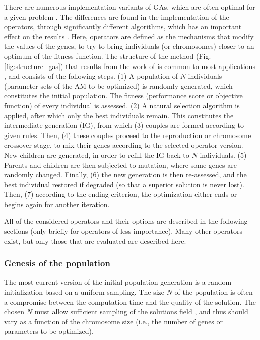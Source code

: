 \documentclass{ametsoc}
\begin{document}
There are numerous implementation variants of GAs, which are often optimal for a given problem \citep{Hart1991a, Schraudolph1992a}. The differences are found in the implementation of the operators, through significantly different algorithms, which has an important effect on the results \citep{Gaffney2010a}. Here, operators are defined as the mechanisms that modify the values of the genes, to try to bring individuals (or chromosomes) closer to an optimum of the fitness function. The structure of the method (Fig. \ref{fig:structure_gas}) that results from the work of \citet{Holland1992b} is common to most applications \citep{Back1993b}, and consists of the following steps. (1) A population of $N$ individuals (parameter sets of the AM to be optimized) is randomly generated, which constitutes the initial population. The fitness (performance score or objective function) of every individual is assessed. (2) A natural selection algorithm is applied, after which only the best individuals remain. This constitutes the intermediate generation (IG), from which (3) couples are formed according to given rules. Then, (4) these couples proceed to the reproduction or chromosome crossover stage, to mix their genes according to the selected operator version. New children are generated, in order to refill the IG back to $N$ individuals. (5) Parents and children are then subjected to mutation, where some genes are randomly changed. Finally, (6) the new generation is then re-assessed, and the best individual restored if degraded (so that a superior solution is never lost). Then, (7) according to the ending criterion, the optimization either ends or begins again for another iteration.


All of the considered operators and their options are described in the following sections (only briefly for operators of less importance). Many other operators exist, but only those that are evaluated are described here.

\subsubsection{Genesis of the population}

The most current version of the initial population generation is a random initialization based on a uniform sampling. The size $N$ of the population is often a compromise between the computation time and the quality of the solution. The chosen $N$ must allow sufficient sampling of the solutions field \citep{Beasley1996a}, and thus should vary as a function of the chromosome size (i.e., the number of genes or parameters to be optimized). 
\end{document}
